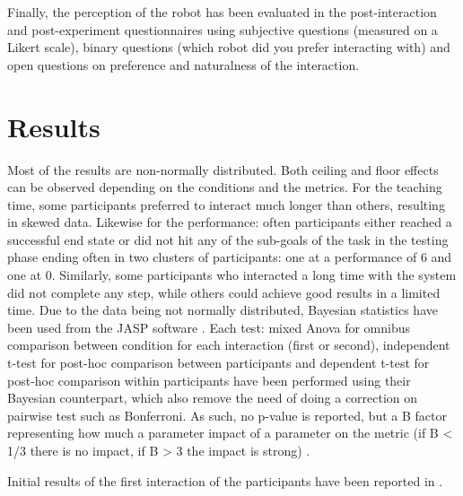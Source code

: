 Finally, the perception of the robot has been evaluated in the post-interaction and post-experiment questionnaires using subjective questions (measured on a Likert scale), binary questions (which robot did you prefer interacting with) and open questions on preference and naturalness of the interaction. 

\section{Results}

Most of the results are non-normally distributed. Both ceiling and floor effects can be observed depending on the conditions and the metrics. For the teaching time, some participants preferred to interact much longer than others, resulting in skewed data. Likewise for the performance: often participants either reached a successful end state or did not hit any of the sub-goals of the task in the testing phase ending often in two clusters of participants: one at a performance of 6 and one at 0.  Similarly, some participants who interacted a long time with the system did not complete any step, while others could achieve good results in a limited time. Due to the data being not normally distributed, Bayesian statistics have been used from the JASP software \citep{jasp2018}. Each test: mixed Anova for omnibus comparison between condition for each interaction (first or second), independent t-test for post-hoc comparison between participants and dependent t-test for post-hoc comparison within participants have been performed using their Bayesian counterpart, which also remove the need of doing a correction on pairwise test such as Bonferroni. As such, no p-value is reported, but a B factor representing how much a parameter impact of a parameter on the metric (if B < 1/3 there is no impact, if B > 3 the impact is strong) \citep{dienes2011bayesian,jeffreys1998theory}.


Initial results of the first interaction of the participants have been reported in \cite{senft2016providing}.



